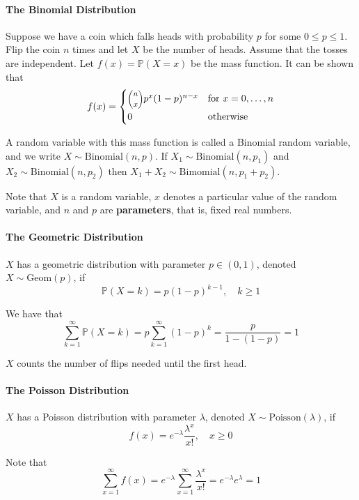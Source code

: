 \paragraph{The Binomial Distribution}\label{the-binomial-distribution}

Suppose we have a coin which falls heads with probability \(p\) for some \(0 \leq p \leq 1\). Flip the coin \(n\) times and let \(X\) be the number of heads. Assume that the tosses are independent. Let \(f(x) = \mathbb{P}(X = x)\) be the mass function. It can be shown that
\[
f(x) = 
\begin{cases}
\binomial{n}{x} p^x (1 - p)^{n - x} &\text{for } x= 0, \dots, n 
\\[1ex]
0 &\text{otherwise}
\end{cases}
\]

A random variable with this mass function is called a Binomial random variable, and we write \(X \sim \text{Binomial}(n, p)\). If \(X_{1} \sim \text{Binomial}(n, p_{1})\) and \(X_{2} \sim \text{Binomial}(n, p_{2})\) then \(X_{1} + X_{2} \sim \text{Bimomial}(n, p_{1} + p_{2})\).

Note that \(X\) is a random variable, \(x\) denotes a particular value of the random variable, and \(n\) and \(p\) are \textbf{parameters}, that is, fixed real numbers.

\paragraph{The Geometric Distribution}\label{the-geometric-distribution}

\(X\) has a geometric distribution with parameter \(p \in (0, 1)\), denoted \(X \sim \text{Geom}(p)\), if
\[
\mathbb{P}(X = k) = p(1 - p)^{k - 1}, \quad k \geq 1
\]

We have that
\[
\sum_{k=1}^{\infty} \mathbb{P}(X = k) = p \sum_{k=1}^{\infty} (1 - p)^{k} = \frac{p}{1 - (1 - p)} = 1
\]

\(X\) counts the number of flips needed until the first head.

\paragraph{The Poisson Distribution}\label{the-poisson-distribution}

\(X\) has a Poisson distribution with parameter \(\lambda\), denoted \(X \sim \text{Poisson}(\lambda)\), if
\[
f(x) = e^{-\lambda} \frac{\lambda^x}{x!}, \quad x \geq 0
\]

Note that
\[
\sum_{x=1}^{\infty} f(x) 
= e^{-\lambda} \sum_{x=1}^{\infty} \frac{\lambda^x}{x!} 
= e^{-\lambda} e^\lambda = 1
\]

